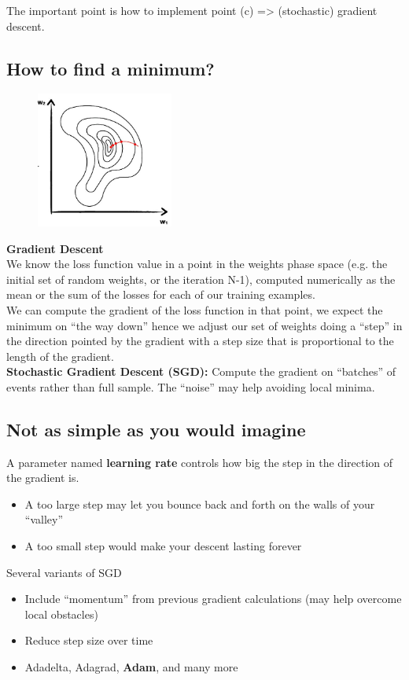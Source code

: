 The important point is how to implement point (c) => (stochastic) gradient descent.

\subsection{How to find a minimum?}


\begin{figure}
	\includegraphics[width=0.4\textwidth]{figure_ml/find_minimum.png}
\end{figure} 

\textbf{Gradient Descent}\\
We know the loss function value in a point in the weights phase space (e.g. the initial set of random weights, or the iteration
N-1), computed numerically as the mean or the sum of the losses for each of our training examples.\\
We can compute the gradient of the loss function in that point, we expect the minimum on “the way down” hence we adjust our set of weights doing a “step” in the direction pointed by the gradient with a step size that is proportional to the length
of the gradient.\\

\textbf{Stochastic Gradient Descent (SGD):}
Compute the gradient on “batches” of events rather than full sample. The “noise” may help avoiding local minima.

\subsection{Not as simple as you would imagine}

A parameter named \textbf{learning rate} controls how big the step in the direction of the gradient is.
\begin{itemize}
	\item A too large step may let you bounce back and forth on the walls of your “valley”
	\item A too small step would make your descent lasting forever
\end{itemize}
Several variants of SGD
\begin{itemize}
	\item Include “momentum” from previous gradient	calculations (may help overcome local obstacles) 
	\item Reduce step size over time
	\item Adadelta, Adagrad, \textbf{Adam}, and many more
\end{itemize}


